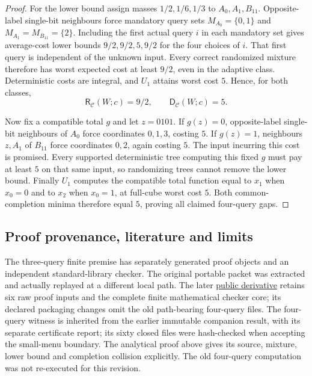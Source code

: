 \documentclass[pdflatex,sn-mathphys-num]{sn-jnl}
\newcommand{\DR}{\mathsf{D}}
\newcommand{\RR}{\mathsf{R}}
\theoremstyle{thmstyleone}
\theoremstyle{thmstylethree}
\theoremstyle{thmstyletwo}
\begin{document}
\begin{proof}
For the lower bound assign masses $1/2,1/6,1/3$ to $A_0,A_1,B_{11}$. Opposite-label single-bit neighbours force mandatory query sets $M_{A_0}=\{0,1\}$ and $M_{A_1}=M_{B_{11}}=\{2\}$. Including the first actual query $i$ in each mandatory set gives average-cost lower bounds $9/2,9/2,5,9/2$ for the four choices of $i$. That first query is independent of the unknown input. Every correct randomized mixture therefore has worst expected cost at least $9/2$, even in the adaptive class. Deterministic costs are integral, and $U_1$ attains worst cost $5$. Hence, for both classes,
\[
 \RR_{\mathcal C}(W;c)=9/2,\qquad\DR_{\mathcal C}(W;c)=5.
\]

Now fix a compatible total $g$ and let $z=0101$. If $g(z)=0$, opposite-label single-bit neighbours of $A_0$ force coordinates $0,1,3$, costing $5$. If $g(z)=1$, neighbours $z,A_1$ of $B_{11}$ force coordinates $0,2$, again costing $5$. The input incurring this cost is promised. Every supported deterministic tree computing this fixed $g$ must pay at least $5$ on that same input, so randomizing trees cannot remove the lower bound. Finally $U_1$ computes the compatible total function equal to $x_1$ when $x_0=0$ and to $x_2$ when $x_0=1$, at full-cube worst cost $5$. Both common-completion minima therefore equal $5$, proving all claimed four-query gaps.
\end{proof}

\subsection{Proof provenance, literature and limits}
The three-query finite premise has separately generated proof objects and an independent standard-library checker. The original portable packet was extracted and actually replayed at a different local path. The later \href{https://github.com/SHiJiE1115/newproj/tree/aade35dbb049f64f6a66e0db8fd79fc269fb0ba5/theory/small_menu_randomization_v01}{public derivative} retains six raw proof inputs and the complete finite mathematical checker core; its declared packaging changes omit the old path-bearing four-query files. The four-query witness is inherited from the earlier immutable companion result, with its separate certificate report; its sixty closed files were hash-checked when accepting the small-menu boundary. The analytical proof above gives its source, mixture, lower bound and completion collision explicitly. The old four-query computation was not re-executed for this revision.
\end{document}
